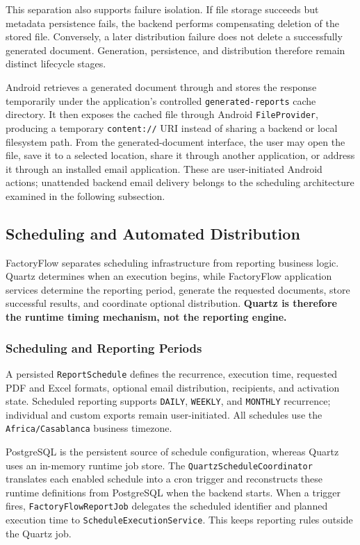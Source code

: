 This separation also supports failure isolation. If file storage succeeds but metadata persistence fails, the backend performs compensating deletion of the stored file. Conversely, a later distribution failure does not delete a successfully generated document. Generation, persistence, and distribution therefore remain distinct lifecycle stages.

Android retrieves a generated document through
and stores the response temporarily under the application's controlled \texttt{generated-reports} cache directory. It then exposes the cached file through Android \texttt{FileProvider}, producing a temporary \texttt{content://} URI instead of sharing a backend or local filesystem path. From the generated-document interface, the user may open the file, save it to a selected location, share it through another application, or address it through an installed email application. These are user-initiated Android actions; unattended backend email delivery belongs to the scheduling architecture examined in the following subsection.
\subsection{Scheduling and Automated Distribution}
\label{subsec:scheduling-automated-distribution}

FactoryFlow separates scheduling infrastructure from reporting business logic. Quartz determines when an execution begins, while FactoryFlow application services determine the reporting period, generate the requested documents, store successful results, and coordinate optional distribution. \textbf{Quartz is therefore the runtime timing mechanism, not the reporting engine.}

\subsubsection{Scheduling and Reporting Periods}

A persisted \texttt{ReportSchedule} defines the recurrence, execution time, requested PDF and Excel formats, optional email distribution, recipients, and activation state. Scheduled reporting supports \texttt{DAILY}, \texttt{WEEKLY}, and \texttt{MONTHLY} recurrence; individual and custom exports remain user-initiated. All schedules use the \texttt{Africa/Casablanca} business timezone.

PostgreSQL is the persistent source of schedule configuration, whereas Quartz uses an in-memory runtime job store. The \texttt{QuartzScheduleCoordinator} translates each enabled schedule into a cron trigger and reconstructs these runtime definitions from PostgreSQL when the backend starts. When a trigger fires, \texttt{FactoryFlowReportJob} delegates the scheduled identifier and planned execution time to \texttt{ScheduleExecutionService}. This keeps reporting rules outside the Quartz job.


